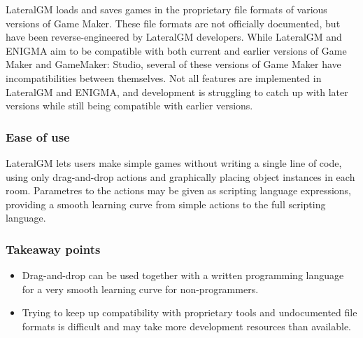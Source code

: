 LateralGM loads and saves games in the proprietary file formats of various 
versions of Game Maker. These file formats are not officially documented, but 
have been reverse-engineered by LateralGM developers\cite{lgmformats}. While 
LateralGM and ENIGMA aim to be compatible with both current and earlier 
versions of Game Maker and GameMaker: Studio, several of these versions of 
Game Maker have incompatibilities between themselves. Not all features are 
implemented in LateralGM and ENIGMA, and development is struggling to catch up 
with later versions while still being compatible with earlier versions.

\subsubsection{Ease of use}
LateralGM lets users make simple games without writing a single line of code, 
using only drag-and-drop actions and graphically placing object instances in 
each room. Parametres to the actions may be given as scripting language 
expressions, providing a smooth learning curve from simple actions to the full 
scripting language.

\subsubsection{Takeaway points}

\begin{itemize}
\item Drag-and-drop can be used together with a written programming language 
    for a very smooth learning curve for non-programmers.
\item Trying to keep up compatibility with proprietary tools and undocumented 
    file formats is difficult and may take more development resources than 
    available.
\end{itemize}
